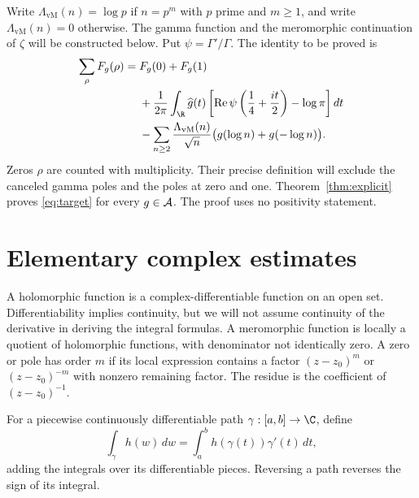 Write $\Lambda_{\mathrm{vM}}(n)=\log p$ if $n=p^m$ with $p$ prime and $m\geq1$,
and write $\Lambda_{\mathrm{vM}}(n)=0$ otherwise.
The gamma function and the meromorphic continuation of $\zeta$ will be
constructed below.  Put $\psi=\Gamma'/\Gamma$.
The identity to be proved is
\begin{equation}
\begin{split}
 \sum_\rho F_g(\rho)={}&F_g(0)+F_g(1)\\
 &+\frac1{2\pi}\int_{\R}\widehat g(t)
 \left[\operatorname{Re}\psi\left(\frac14+\frac{it}{2}\right)-\log\pi\right]dt\\
 &-\sum_{n\geq2}\frac{\Lambda_{\mathrm{vM}}(n)}{\sqrt n}
                      \bigl(g(\log n)+g(-\log n)\bigr).
\end{split}
\label{eq:target}
\end{equation}
Zeros $\rho$ are counted with multiplicity.  Their precise definition will
exclude the canceled gamma poles and the poles at zero and one.
Theorem~\ref{thm:explicit} proves \eqref{eq:target} for every $g\in\mathcal A$.
The proof uses no positivity statement.

\section{Elementary complex estimates}
\label{sec:complex}

A holomorphic function is a complex-differentiable function on an open set.
Differentiability implies continuity, but we will not assume continuity
of the derivative in deriving the integral formulas.
A meromorphic function is locally a quotient of holomorphic functions,
with denominator not identically zero.
A zero or pole has order $m$ if its local expression contains a factor
$(z-z_0)^m$ or $(z-z_0)^{-m}$ with nonzero remaining factor.
The residue is the coefficient of $(z-z_0)^{-1}$.

For a piecewise continuously differentiable path $\gamma:[a,b]\to\C$,
define
\[
 \int_\gamma h(w)\,dw
   =\int_a^b h(\gamma(t))\gamma'(t)\,dt,
\]
adding the integrals over its differentiable pieces.
Reversing a path reverses the sign of its integral.

